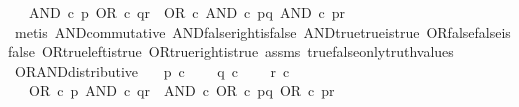 \begin{isabellebody}
\ \ \ {\isachardoublequoteopen}AND\ {\isasymcirc}\isactrlsub c\ {\isasymlangle}p{\isacharcomma}{\kern0pt}\ OR\ {\isasymcirc}\isactrlsub c\ {\isasymlangle}q{\isacharcomma}{\kern0pt}r{\isasymrangle}{\isasymrangle}\ {\isacharequal}{\kern0pt}\ OR\ {\isasymcirc}\isactrlsub c\ {\isasymlangle}AND\ {\isasymcirc}\isactrlsub c\ {\isasymlangle}p{\isacharcomma}{\kern0pt}q{\isasymrangle}{\isacharcomma}{\kern0pt}\ AND\ {\isasymcirc}\isactrlsub c\ {\isasymlangle}p{\isacharcomma}{\kern0pt}r{\isasymrangle}{\isasymrangle}{\isachardoublequoteclose}\isanewline
%
\isadelimproof
\ \ %
\endisadelimproof
%
\isatagproof
{}\isamarkupfalse%
\ {\isacharparenleft}{\kern0pt}metis\ AND{\isacharunderscore}{\kern0pt}commutative\ AND{\isacharunderscore}{\kern0pt}false{\isacharunderscore}{\kern0pt}right{\isacharunderscore}{\kern0pt}is{\isacharunderscore}{\kern0pt}false\ AND{\isacharunderscore}{\kern0pt}true{\isacharunderscore}{\kern0pt}true{\isacharunderscore}{\kern0pt}is{\isacharunderscore}{\kern0pt}true\ OR{\isacharunderscore}{\kern0pt}false{\isacharunderscore}{\kern0pt}false{\isacharunderscore}{\kern0pt}is{\isacharunderscore}{\kern0pt}false\ OR{\isacharunderscore}{\kern0pt}true{\isacharunderscore}{\kern0pt}left{\isacharunderscore}{\kern0pt}is{\isacharunderscore}{\kern0pt}true\ OR{\isacharunderscore}{\kern0pt}true{\isacharunderscore}{\kern0pt}right{\isacharunderscore}{\kern0pt}is{\isacharunderscore}{\kern0pt}true\ assms\ true{\isacharunderscore}{\kern0pt}false{\isacharunderscore}{\kern0pt}only{\isacharunderscore}{\kern0pt}truth{\isacharunderscore}{\kern0pt}values{\isacharparenright}{\kern0pt}%
\endisatagproof
{\isafoldproof}%
%
\isadelimproof
\isanewline
%
\endisadelimproof
\isanewline
{}\isamarkupfalse%
\ OR{\isacharunderscore}{\kern0pt}AND{\isacharunderscore}{\kern0pt}distributive{\isacharcolon}{\kern0pt}\isanewline
\ \ \ {\isachardoublequoteopen}p\ {\isasymin}\isactrlsub c\ {\isasymOmega}{\isachardoublequoteclose}\isanewline
\ \ \ {\isachardoublequoteopen}q\ {\isasymin}\isactrlsub c\ {\isasymOmega}{\isachardoublequoteclose}\isanewline
\ \ \ {\isachardoublequoteopen}r\ {\isasymin}\isactrlsub c\ {\isasymOmega}{\isachardoublequoteclose}\isanewline
\ \ \ {\isachardoublequoteopen}OR\ {\isasymcirc}\isactrlsub c\ {\isasymlangle}p{\isacharcomma}{\kern0pt}\ AND\ {\isasymcirc}\isactrlsub c\ {\isasymlangle}q{\isacharcomma}{\kern0pt}r{\isasymrangle}{\isasymrangle}\ {\isacharequal}{\kern0pt}\ AND\ {\isasymcirc}\isactrlsub c\ {\isasymlangle}OR\ {\isasymcirc}\isactrlsub c\ {\isasymlangle}p{\isacharcomma}{\kern0pt}q{\isasymrangle}{\isacharcomma}{\kern0pt}\ OR\ {\isasymcirc}\isactrlsub c\ {\isasymlangle}p{\isacharcomma}{\kern0pt}r{\isasymrangle}{\isasymrangle}{\isachardoublequoteclose}\isanewline

\end{isabellebody}
